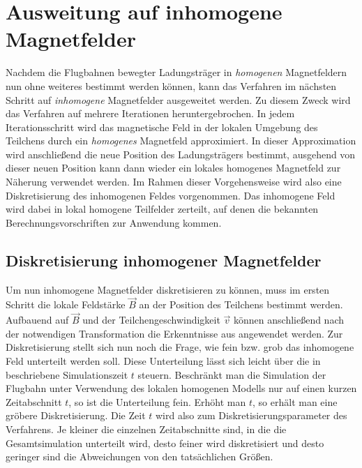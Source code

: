 \section{Ausweitung auf inhomogene Magnetfelder}

Nachdem die Flugbahnen bewegter Ladungstr\"ager in \textit{homogenen} Magnetfeldern nun ohne weiteres bestimmt werden k\"onnen, kann
das Verfahren im n\"achsten Schritt auf \textit{inhomogene} Magnetfelder ausgeweitet werden. Zu diesem Zweck wird das Verfahren
auf mehrere Iterationen heruntergebrochen. In jedem Iterationsschritt wird das magnetische Feld in der lokalen Umgebung des Teilchens
durch ein \textit{homogenes} Magnetfeld approximiert. In dieser Approximation wird anschlie{\ss}end die neue Position des
Ladungstr\"agers bestimmt, ausgehend von dieser neuen Position kann dann wieder ein lokales homogenes Magnetfeld zur N\"aherung
verwendet werden. Im Rahmen dieser Vorgehensweise wird also eine Diskretisierung des inhomogenen Feldes vorgenommen. Das inhomogene
Feld wird dabei in lokal homogene Teilfelder zerteilt, auf denen die bekannten Berechnungsvorschriften zur Anwendung kommen.

\subsection{Diskretisierung inhomogener Magnetfelder}

Um nun inhomogene Magnetfelder diskretisieren zu k\"onnen, muss im ersten Schritt die lokale Feldst\"arke \(\vec{B}\) an der Position
des Teilchens bestimmt werden. Aufbauend auf \(\vec{B}\) und der Teilchengeschwindigkeit \(\vec{v}\) k\"onnen anschlie{\ss}end nach
der notwendigen Transformation die Erkenntnisse aus  angewendet werden. Zur Diskretisierung stellt
sich nun noch die
Frage, wie fein bzw. grob das inhomogene Feld unterteilt werden soll. Diese Unterteilung l\"asst sich leicht \"uber die in
 beschriebene Simulationszeit \(t\) steuern. Beschr\"ankt man die Simulation der Flugbahn unter
Verwendung des lokalen homogenen Modells nur auf einen kurzen Zeitabschnitt \(t\), so ist die Unterteilung fein. Erh\"oht man \(t\),
so erh\"alt man eine gr\"obere Diskretisierung. Die Zeit \(t\) wird also zum Diskretisierungsparameter des Verfahrens. Je kleiner
die einzelnen Zeitabschnitte sind, in die die Gesamtsimulation unterteilt wird, desto feiner wird diskretisiert und desto geringer
sind die Abweichungen von den tats\"achlichen Gr\"o{\ss}en.

